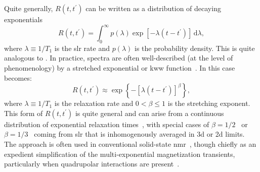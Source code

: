 \documentclass[
  aps,
  prb,
  twocolumn,
  reprint,
  superscriptaddress,
  floatfix,
  citeautoscript,
  longbibliography,
]{revtex4-2}
\newcommand{\latin}[1]{#1}
\begin{document}
Quite generally, $R \left (t, t^{\prime} \right )$ can be written as a distribution of decaying exponentials
\begin{equation} \label{eq:slr-integral}
   R \left (t, t^{\prime} \right ) = \int_{0}^{\infty} p ( \lambda ) \exp \left [-  \lambda \left ( t - t^{\prime} \right ) \right ] \, \mathrm{d} \lambda ,
\end{equation}
where $\lambda \equiv 1 / T_{1}$ is the \gls{slr} rate and $p ( \lambda )$ is the probability density.
This is quite analogous to .
In practice, spectra are often well-described (at the level of phenomenology) by a stretched exponential or \gls{kww} function~\cite{1854-Kohlrausch-AP-167-179, 1970-Williams-TFS-66-80, 1980-Lindsay-JCP-73-3348, 2006-Johnston-PRB-74-184430, 2016-Wu-SR-6-20506}.
In this case  becomes:
\begin{equation} \label{eq:slr-stretched}
   R \left ( t, t^{\prime} \right ) \approx \exp \left \{ - \left  [ \lambda \left ( t-t^{\prime} \right ) \right ]^{\beta} \right \},
\end{equation}
where $\lambda \equiv 1/T_{1}$ is the relaxation rate and $0 < \beta \leq 1$ is the stretching exponent.
This form of $R \left ( t, t^{\prime} \right )$ is quite general and can arise from a continuous distribution of exponential relaxation times~\cite{2006-Johnston-PRB-74-184430}, with special cases of $\beta = 1/2$~\cite{1968-Tse-PRL-21-511, 1984-Stockmann-JNCS-66-501} or $\beta = 1/3$~\cite{1992-Bader-JPCM-4-4779} coming from \gls{slr} that is inhomogenously averaged in \gls{3d} or \gls{2d} limits.
The approach is often used in conventional solid-state \gls{nmr}~\cite{1995-Narayanan-JMRSA-112-58}, though chiefly as an expedient simplification of the multi-exponential magnetization transients, particularly when quadrupolar interactions are present~\cite{1995-McDowell-JMRSA-113-242}.
\end{document}
